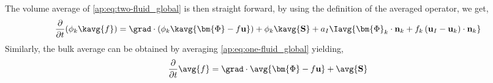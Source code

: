 The volume average of \ref{ap:eq:two-fluid_global} is then straight forward, by using the definition of the averaged operator, we get, 
\begin{equation*}
    \frac{\partial}{\partial t} (\phi_k\kavg{f})
    = \grad \cdot \left(
        \phi_k \kavg{\bm{\Phi} - f \textbf{u}}
    \right)
    + \phi_k \kavg{\textbf{S}}
    + a_I \Iavg{
        \bm{\Phi}_k \cdot \textbf{n}_k
        + f_k 
        \left(
            \textbf{u}_I
            - \textbf{u}_k
        \right) \cdot \textbf{n}_k
    } 
\end{equation*}
Similarly, the bulk average can be obtained by averaging \ref{ap:eq:one-fluid_global} yielding, 
\begin{equation*}
    \frac{\partial}{\partial t} \avg{f}
    = \grad \cdot \avg{\bm{\Phi} - f \textbf{u}}
    + \avg{\textbf{S}}
    \label{ap:eq:avg_global}
\end{equation*}

